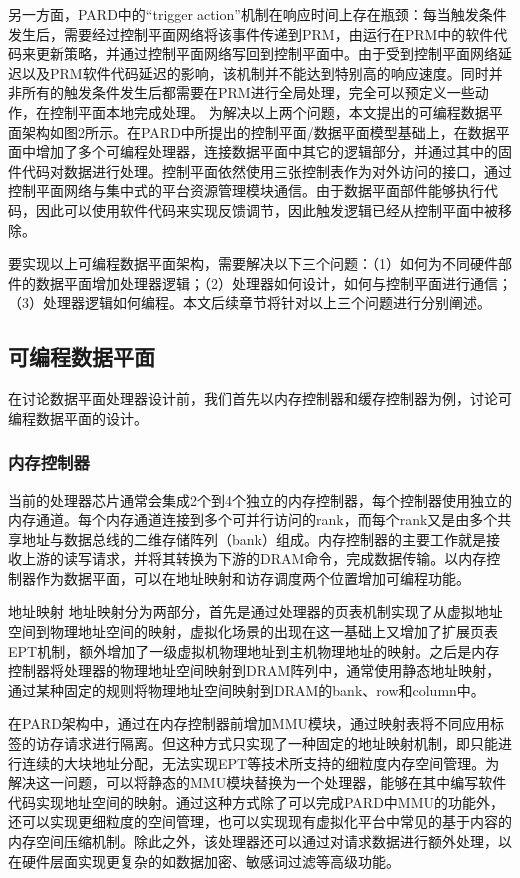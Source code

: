 另一方面，PARD中的“triggeraction”机制在响应时间上存在瓶颈：每当触发条件发生后，需要经过控制平面网络将该事件传递到PRM，由运行在PRM中的软件代码来更新策略，并通过控制平面网络写回到控制平面中。由于受到控制平面网络延迟以及PRM软件代码延迟的影响，该机制并不能达到特别高的响应速度。同时并非所有的触发条件发生后都需要在PRM进行全局处理，完全可以预定义一些动作，在控制平面本地完成处理。
为解决以上两个问题，本文提出的可编程数据平面架构如图2所示。在PARD中所提出的控制平面/数据平面模型基础上，在数据平面中增加了多个可编程处理器，连接数据平面中其它的逻辑部分，并通过其中的固件代码对数据进行处理。控制平面依然使用三张控制表作为对外访问的接口，通过控制平面网络与集中式的平台资源管理模块通信。由于数据平面部件能够执行代码，因此可以使用软件代码来实现反馈调节，因此触发逻辑已经从控制平面中被移除。
 
要实现以上可编程数据平面架构，需要解决以下三个问题：（1）如何为不同硬件部件的数据平面增加处理器逻辑；（2）处理器如何设计，如何与控制平面进行通信；（3）处理器逻辑如何编程。本文后续章节将针对以上三个问题进行分别阐述。

\subsection{可编程数据平面}

在讨论数据平面处理器设计前，我们首先以内存控制器和缓存控制器为例，讨论可编程数据平面的设计。

\subsubsection*{内存控制器}
当前的处理器芯片通常会集成2个到4个独立的内存控制器，每个控制器使用独立的内存通道。每个内存通道连接到多个可并行访问的rank，而每个rank又是由多个共享地址与数据总线的二维存储阵列（bank）组成。内存控制器的主要工作就是接收上游的读写请求，并将其转换为下游的DRAM命令，完成数据传输。以内存控制器作为数据平面，可以在地址映射和访存调度两个位置增加可编程功能。

地址映射 地址映射分为两部分，首先是通过处理器的页表机制实现了从虚拟地址空间到物理地址空间的映射，虚拟化场景的出现在这一基础上又增加了扩展页表EPT机制，额外增加了一级虚拟机物理地址到主机物理地址的映射。之后是内存控制器将处理器的物理地址空间映射到DRAM阵列中，通常使用静态地址映射，通过某种固定的规则将物理地址空间映射到DRAM的bank、row和column中。

在PARD架构中，通过在内存控制器前增加MMU模块，通过映射表将不同应用标签的访存请求进行隔离。但这种方式只实现了一种固定的地址映射机制，即只能进行连续的大块地址分配，无法实现EPT等技术所支持的细粒度内存空间管理。为解决这一问题，可以将静态的MMU模块替换为一个处理器，能够在其中编写软件代码实现地址空间的映射。通过这种方式除了可以完成PARD中MMU的功能外，还可以实现更细粒度的空间管理，也可以实现现有虚拟化平台中常见的基于内容的内存空间压缩机制。除此之外，该处理器还可以通过对请求数据进行额外处理，以在硬件层面实现更复杂的如数据加密、敏感词过滤等高级功能。

